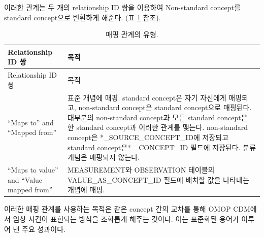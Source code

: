 \documentclass[10.5pt]{book}
\theoremstyle{definition}
\theoremstyle{definition}
\theoremstyle{definition}
\theoremstyle{remark}
\begin{document}
이러한 관계는 두 개의 relationship ID 쌍을 이용하여 Non-standard
concept를 standard concept으로 변환하게 해준다. (표
\ref{tab:mappingRelationships} 참조). 

\begin{longtable}[]{@{}ll@{}}
\caption{\label{tab:mappingRelationships} 매핑 관계의 유형.}\tabularnewline
\toprule
\begin{minipage}[b]{0.20\columnwidth}\raggedright\strut
Relationship ID 쌍\strut
\end{minipage} & \begin{minipage}[b]{0.71\columnwidth}\raggedright\strut
목적\strut
\end{minipage}\tabularnewline
\midrule
\endfirsthead
\toprule
\begin{minipage}[b]{0.20\columnwidth}\raggedright\strut
Relationship ID 쌍\strut
\end{minipage} & \begin{minipage}[b]{0.71\columnwidth}\raggedright\strut
목적\strut
\end{minipage}\tabularnewline
\midrule
\endhead
\begin{minipage}[t]{0.20\columnwidth}\raggedright\strut
``Maps to'' and ``Mapped from''\strut
\end{minipage} & \begin{minipage}[t]{0.71\columnwidth}\raggedright\strut
표준 개념에 매핑. standard concept은 자기 자신에게 매핑되고,
non-standard concept은 standard concept으로 매핑된다. 대부분의
non-standard concept과 모든 standard concept은 한 standard concept과
이러한 관계를 맺는다. non-standard concept은 *\_SOURCE\_CONCEPT\_ID에
저장되고 standard concept은* \_CONCEPT\_ID 필드에 저장된다. 분류 개념은
매핑되지 않는다.\strut
\end{minipage}\tabularnewline
\begin{minipage}[t]{0.20\columnwidth}\raggedright\strut
``Maps to value'' and ``Value mapped from''\strut
\end{minipage} & \begin{minipage}[t]{0.71\columnwidth}\raggedright\strut
MEASUREMENT와 OBSERVATION 테이블의 VALUE\_AS\_CONCEPT\_ID 필드에 배치할
값을 나타내는 개념에 매핑.\strut
\end{minipage}\tabularnewline
\bottomrule
\end{longtable}

이러한 매핑 관계를 사용하는 목적은 같은 concept 간의 교차를 통해 OMOP
CDM에서 임상 사건이 표현되는 방식을 조화롭게 해주는 것이다. 이는
표준화된 용어가 이루어 낸 주요 성과이다.
\end{document}
